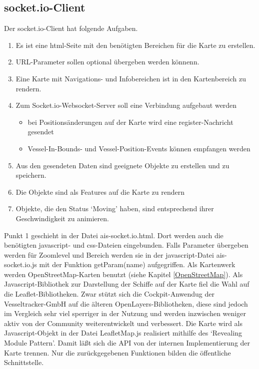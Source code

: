 \subsection{socket.io-Client}\label{socket.io-Client}
Der socket.io-Client hat folgende Aufgaben.
\begin{enumerate}
\item Es ist eine html-Seite mit den benötigten Bereichen für die Karte zu erstellen.
\item URL-Parameter sollen optional übergeben werden könnenn.
\item Eine Karte mit Navigations- und Infobereichen ist in den Kartenbereich zu rendern.
\item Zum Socket.io-Websocket-Server soll eine Verbindung aufgebaut werden
\begin{itemize}
\item bei Positionsänderungen auf der Karte wird eine register-Nachricht gesendet
\item Vessel-In-Bounds- und Vessel-Position-Events können empfangen werden
\end{itemize}
\item Aus den gesendeten Daten sind geeignete Objekte zu erstellen und zu speichern.
\item Die Objekte sind als Features auf die Karte zu rendern
\item Objekte, die den Status ‘Moving’ haben, sind entsprechend ihrer Geschwindigkeit zu animieren.
\end{enumerate}
Punkt 1 geschieht in der Datei ais-socket.io.html. Dort werden auch die benötigten javascript- und css-Dateien eingebunden. Falls Parameter übergeben werden für Zoomlevel und Bereich werden sie in der javascript-Datei ais-socket.io.js mit der Funktion getParam(name) aufgegriffen.
Als Kartenwerk werden OpenStreetMap-Karten benutzt (siehe Kapitel \ref{OpenStreetMap}). Als Javascript-Bibliothek zur Darstellung der Schiffe auf der Karte fiel die Wahl auf die Leaflet-Bibliotheken. Zwar stützt sich die Cockpit-Anwendug der Vesseltracker-GmbH auf die älteren OpenLayers-Bibliotheken, diese sind jedoch im Vergleich sehr viel sperriger in der Nutzung und werden inzwischen weniger aktiv von der Community weiterentwickelt und verbessert.
Die Karte wird als Javascript-Objekt in der Datei LeafletMap.js realisiert mithilfe des ‘Revealing Module Pattern’. Damit läßt sich die API von der internen Implementierung der Karte trennen. Nur die zurückgegebenen Funktionen bilden die öffentliche Schnittstelle.

